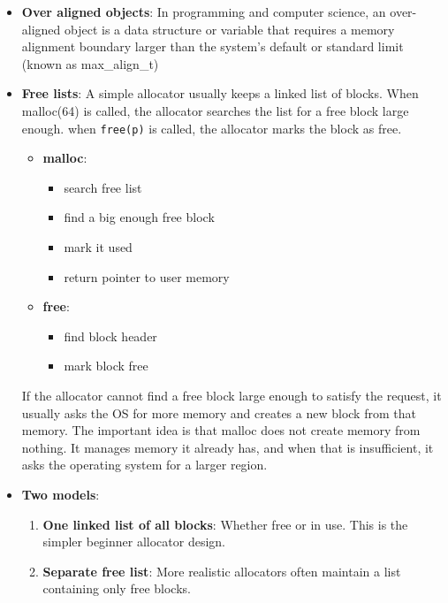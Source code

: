 \documentclass{report}
\begin{document}
\begin{itemize}
            \item \textbf{Over aligned objects}: In programming and computer science, an over-aligned object is a data structure or variable that requires a memory alignment boundary larger than the system's default or standard limit (known as max\_align\_t)
            \item \textbf{Free lists}: A simple allocator usually keeps a linked list of blocks. When malloc(64) is called, the allocator searches the list for a free block large enough.
                \bigbreak \noindent 
                when \texttt{free(p)} is called, the allocator marks the block as free.
                \begin{itemize}
                    \item \textbf{malloc}:
                        \begin{itemize}
                            \item search free list
                            \item find a big enough free block
                            \item mark it used
                            \item return pointer to user memory
                        \end{itemize}
                    \item \textbf{free}:
                        \begin{itemize}
                            \item find block header
                            \item mark block free
                        \end{itemize}
                \end{itemize}
                If the allocator cannot find a free block large enough to satisfy the request, it usually asks the OS for more memory and creates a new block from that memory.
                \bigbreak \noindent 
                The important idea is that malloc does not create memory from nothing. It manages memory it already has, and when that is insufficient, it asks the operating system for a larger region.
            \item \textbf{Two models}:
                \begin{enumerate}
                    \item \textbf{One linked list of all blocks}: Whether free or in use. This is the simpler beginner allocator design.
                    \item \textbf{Separate free list}: More realistic allocators often maintain a list containing only free blocks.

\end{enumerate}
\end{itemize}
\end{document}
